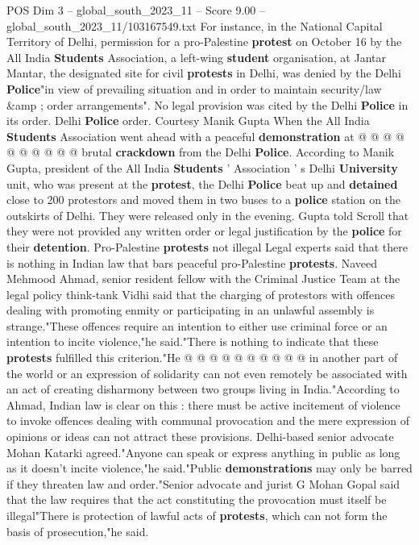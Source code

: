 \begin{textsample}{POS Dim 3 – global\_south\_2023\_11 – Score 9.00 – global\_south\_2023\_11/103167549.txt}
For instance, in the National Capital Territory of Delhi, permission for a pro-Palestine \textbf{protest} on October 16 by the All India \textbf{Students} Association, a left-wing \textbf{student} organisation, at Jantar Mantar, the designated site for civil \textbf{protests} in Delhi, was denied by the Delhi \textbf{Police}"in view of prevailing situation and in order to maintain security/law \&amp ; order arrangements".
No legal provision was cited by the Delhi \textbf{Police} in its order.
Delhi \textbf{Police} order.
Courtesy Manik Gupta When the All India \textbf{Students} Association went ahead with a peaceful \textbf{demonstration} at @ @ @ @ @ @ @ @ @ @ brutal \textbf{crackdown} from the Delhi \textbf{Police}.
According to Manik Gupta, president of the All India \textbf{Students} ' Association ' s Delhi \textbf{University} unit, who was present at the \textbf{protest}, the Delhi \textbf{Police} beat up and \textbf{detained} close to 200 protestors and moved them in two buses to a \textbf{police} station on the outskirts of Delhi.
They were released only in the evening.
Gupta told Scroll that they were not provided any written order or legal justification by the \textbf{police} for their \textbf{detention}.
Pro-Palestine \textbf{protests} not illegal Legal experts said that there is nothing in Indian law that bars peaceful pro-Palestine \textbf{protests}.
Naveed Mehmood Ahmad, senior resident fellow with the Criminal Justice Team at the legal policy think-tank Vidhi said that the charging of protestors with offences dealing with promoting enmity or participating in an unlawful assembly is strange."These offences require an intention to either use criminal force or an intention to incite violence,"he said."There is nothing to indicate that these \textbf{protests} fulfilled this criterion."He @ @ @ @ @ @ @ @ @ @ in another part of the world or an expression of solidarity can not even remotely be associated with an act of creating disharmony between two groups living in India."According to Ahmad, Indian law is clear on this : there must be active incitement of violence to invoke offences dealing with communal provocation and the mere expression of opinions or ideas can not attract these provisions.
Delhi-based senior advocate Mohan Katarki agreed."Anyone can speak or express anything in public as long as it doesn't incite violence,"he said."Public \textbf{demonstrations} may only be barred if they threaten law and order."Senior advocate and jurist G Mohan Gopal said that the law requires that the act constituting the provocation must itself be illegal"There is protection of lawful acts of \textbf{protests}, which can not form the basis of prosecution,"he said.

\end{textsample}
